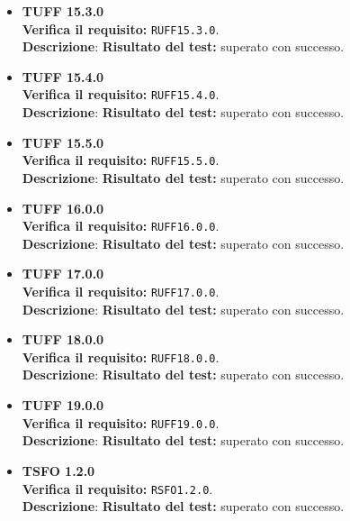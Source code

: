 \begin{itemize}
\item \textbf{TUFF 15.3.0}\\
\textbf{Verifica il requisito:} \texttt{RUFF15.3.0}.\\
\textbf{Descrizione}: %
\textbf{Risultato del test:} superato con successo.

\item \textbf{TUFF 15.4.0}\\
\textbf{Verifica il requisito:} \texttt{RUFF15.4.0}.\\
\textbf{Descrizione}: %
\textbf{Risultato del test:} superato con successo.

\item \textbf{TUFF 15.5.0}\\
\textbf{Verifica il requisito:} \texttt{RUFF15.5.0}.\\
\textbf{Descrizione}: %
\textbf{Risultato del test:} superato con successo.

\item \textbf{TUFF 16.0.0}\\
\textbf{Verifica il requisito:} \texttt{RUFF16.0.0}.\\
\textbf{Descrizione}: %
\textbf{Risultato del test:} superato con successo.

\item \textbf{TUFF 17.0.0}\\
\textbf{Verifica il requisito:} \texttt{RUFF17.0.0}.\\
\textbf{Descrizione}: %
\textbf{Risultato del test:} superato con successo.

\item \textbf{TUFF 18.0.0}\\
\textbf{Verifica il requisito:} \texttt{RUFF18.0.0}.\\
\textbf{Descrizione}: %
\textbf{Risultato del test:} superato con successo.

\item \textbf{TUFF 19.0.0}\\
\textbf{Verifica il requisito:} \texttt{RUFF19.0.0}.\\
\textbf{Descrizione}: %
\textbf{Risultato del test:} superato con successo.

\item \textbf{TSFO 1.2.0}\\
\textbf{Verifica il requisito:} \texttt{RSFO1.2.0}.\\
\textbf{Descrizione}: %
\textbf{Risultato del test:} superato con successo.


\end{itemize}
